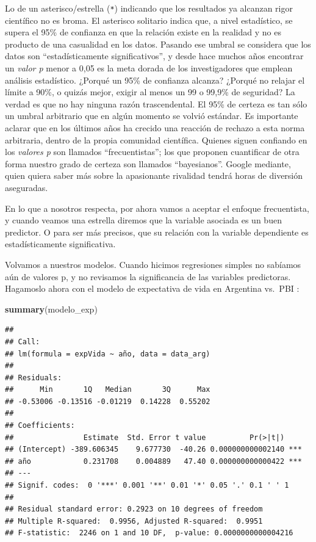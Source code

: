 \documentclass[]{book}
\newenvironment{Shaded}{\begin{snugshade}}{\end{snugshade}}
\newcommand{\KeywordTok}[1]{\textcolor[rgb]{0.13,0.29,0.53}{\textbf{#1}}}
\newcommand{\NormalTok}[1]{#1}
\begin{document}
Lo de un asterisco/estrella (\texttt{*}) indicando que los resultados ya
alcanzan rigor científico no es broma. El asterisco solitario indica
que, a nivel estadístico, se supera el 95\% de confianza en que la
relación existe en la realidad y no es producto de una casualidad en los
datos. Pasando ese umbral se considera que los datos son
``estadísticamente significativos'', y desde hace muchos años encontrar
un \emph{valor p} menor a 0,05 es la meta dorada de los investigadores
que emplean análisis estadístico. ¿Porqué un 95\% de confianza alcanza?
¿Porqué no relajar el límite a 90\%, o quizás mejor, exigir al menos un
99 o 99,9\% de seguridad? La verdad es que no hay ninguna razón
trascendental. El 95\% de certeza es tan sólo un umbral arbitrario que
en algún momento se volvió estándar. Es importante aclarar que en los
últimos años ha crecido una reacción de rechazo a esta norma arbitraria,
dentro de la propia comunidad científica. Quienes siguen confiando en
los \emph{valores p} son llamados ``frecuentistas''; los que proponen
cuantificar de otra forma nuestro grado de certeza son llamados
``bayesianos''. Google mediante, quien quiera saber más sobre la
apasionante rivalidad tendrá horas de diversión aseguradas.

En lo que a nosotros respecta, por ahora vamos a aceptar el enfoque
frecuentista, y cuando veamos una estrella diremos que la variable
asociada es un buen predictor. O para ser más precisos, que su relación
con la variable dependiente es estadísticamente significativa.

Volvamos a nuestros modelos. Cuando hicimos regresiones simples no
sabíamos aún de valores p, y no revisamos la significancia de las
variables predictoras. Hagamoslo ahora con el modelo de expectativa de
vida en Argentina vs.~PBI :

\begin{Shaded}
\begin{Highlighting}[]
\KeywordTok{summary}\NormalTok{(modelo_exp)}
\end{Highlighting}
\end{Shaded}

\begin{verbatim}
## 
## Call:
## lm(formula = expVida ~ año, data = data_arg)
## 
## Residuals:
##      Min       1Q   Median       3Q      Max 
## -0.53006 -0.13516 -0.01219  0.14228  0.55202 
## 
## Coefficients:
##                Estimate  Std. Error t value          Pr(>|t|)    
## (Intercept) -389.606345    9.677730  -40.26 0.000000000002140 ***
## año            0.231708    0.004889   47.40 0.000000000000422 ***
## ---
## Signif. codes:  0 '***' 0.001 '**' 0.01 '*' 0.05 '.' 0.1 ' ' 1
## 
## Residual standard error: 0.2923 on 10 degrees of freedom
## Multiple R-squared:  0.9956, Adjusted R-squared:  0.9951 
## F-statistic:  2246 on 1 and 10 DF,  p-value: 0.0000000000004216
\end{verbatim}
\end{document}
